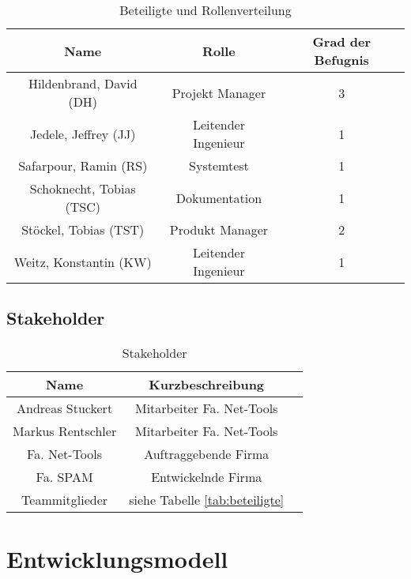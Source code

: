 \begin{table}[htdp]
\caption{Beteiligte und Rollenverteilung}
\label{tab:beteiligte}
\begin{center}
\begin{tabular}{|c|c|c|}
\hline
\textbf{Name} & \textbf{Rolle} & \textbf{Grad der Befugnis} \\
\hline
Hildenbrand, David (DH) & Projekt Manager & 3 \\
\hline
Jedele, Jeffrey (JJ) & Leitender Ingenieur & 1 \\
\hline
Safarpour, Ramin (RS) & Systemtest & 1 \\
\hline
Schoknecht, Tobias (TSC) & Dokumentation & 1 \\
\hline
Stöckel, Tobias (TST) & Produkt Manager & 2 \\
\hline
Weitz, Konstantin (KW) & Leitender Ingenieur & 1  \\
\hline
\end{tabular}
\end{center}
\label{default}
\end{table}

\section{Stakeholder}

\begin{table}[htdp]
\caption{Stakeholder}
\label{tab:stakeholder}
\begin{center}
\begin{tabular}{|c|c|c|}
\hline
\textbf{Name} & \textbf{Kurzbeschreibung}\\
\hline
Andreas Stuckert & Mitarbeiter Fa. Net-Tools \\
\hline
Markus Rentschler & Mitarbeiter Fa. Net-Tools \\
\hline
Fa. Net-Tools & Auftraggebende Firma \\
\hline
Fa. SPAM & Entwickelnde Firma \\
\hline
Teammitglieder & siehe Tabelle \ref{tab:beteiligte} \\
\hline
\end{tabular}
\end{center}
\label{default}
\end{table}

\chapter{Entwicklungsmodell}
\label{cha:entw}

